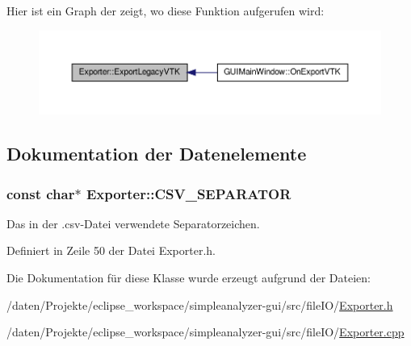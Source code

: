 Hier ist ein Graph der zeigt, wo diese Funktion aufgerufen wird\-:\nopagebreak
\begin{figure}[H]
\begin{center}
\leavevmode
\includegraphics[width=350pt]{classExporter_a59d03f0a582498e15397230b70ad1e80_icgraph}
\end{center}
\end{figure}




\subsection{Dokumentation der Datenelemente}
\hypertarget{classExporter_adeac3ad5015cbb76e6c9c1ecdb9e0fab}{
\subsubsection[{C\-S\-V\-\_\-\-S\-E\-P\-A\-R\-A\-T\-O\-R}]{\setlength{\rightskip}{0pt plus 5cm}const char$\ast$ Exporter\-::\-C\-S\-V\-\_\-\-S\-E\-P\-A\-R\-A\-T\-O\-R\hspace{0.3cm}{\ttfamily [protected]}}}\label{classExporter_adeac3ad5015cbb76e6c9c1ecdb9e0fab}


Das in der .csv-\/\-Datei verwendete Separatorzeichen. 



Definiert in Zeile 50 der Datei Exporter.\-h.



Die Dokumentation für diese Klasse wurde erzeugt aufgrund der Dateien\-:\begin{DoxyCompactItemize}
\item 
/daten/\-Projekte/eclipse\-\_\-workspace/simpleanalyzer-\/gui/src/file\-I\-O/\hyperlink{Exporter_8h}{Exporter.\-h}\item 
/daten/\-Projekte/eclipse\-\_\-workspace/simpleanalyzer-\/gui/src/file\-I\-O/\hyperlink{Exporter_8cpp}{Exporter.\-cpp}\end{DoxyCompactItemize}
